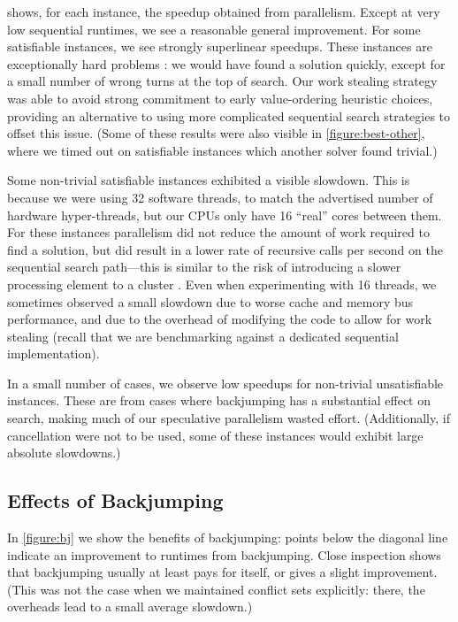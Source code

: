 \documentclass{llncs}
\begin{document}
 shows, for each instance, the speedup obtained from parallelism. Except at
very low sequential runtimes, we see a reasonable general improvement.  For some satisfiable
instances, we see strongly superlinear speedups. These instances are exceptionally hard problems
\cite{Smith:1997}: we would have found a solution quickly, except for a small number of wrong turns
at the top of search. Our work stealing strategy was able to avoid strong commitment to early
value-ordering heuristic choices, providing an alternative to using more complicated sequential
search strategies to offset this issue. (Some of these results were also visible in
\cref{figure:best-other}, where we timed out on satisfiable instances which another solver found
trivial.)

Some non-trivial satisfiable instances exhibited a visible slowdown. This is because we were using
32 software threads, to match the advertised number of hardware hyper-threads, but our CPUs only
have 16 ``real'' cores between them. For these instances parallelism did not reduce the amount of
work required to find a solution, but did result in a lower rate of recursive calls per second on
the sequential search path---this is similar to the risk of introducing a slower processing element
to a cluster \cite{Trienekens:1990}. Even when experimenting with 16 threads, we sometimes observed
a small slowdown due to worse cache and memory bus performance, and due to the overhead of modifying
the code to allow for work stealing (recall that we are benchmarking against a dedicated sequential
implementation).

In a small number of cases, we observe low speedups for non-trivial unsatisfiable instances. These
are from cases where backjumping has a substantial effect on search, making much of our speculative
parallelism wasted effort. (Additionally, if cancellation were not to be used, some of these
instances would exhibit large absolute slowdowns.)

\subsection{Effects of Backjumping}

In \cref{figure:bj} we show the benefits of backjumping: points below the diagonal line indicate an
improvement to runtimes from backjumping. Close inspection shows that backjumping usually at least
pays for itself, or gives a slight improvement. (This was not the case when we maintained conflict
sets explicitly: there, the overheads lead to a small average slowdown.)
\end{document}
